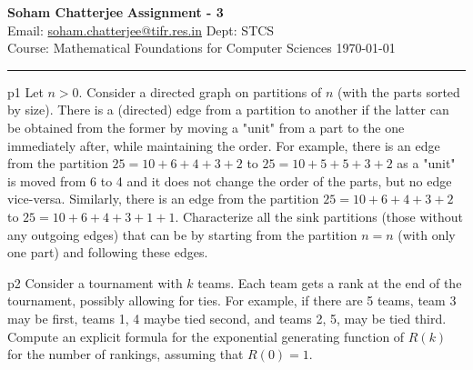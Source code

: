 \documentclass[a4paper, 11pt]{article}
\begin{document}
	
	
	{\noindent \large\textbf{Soham Chatterjee} \hfill \textbf{Assignment - 3}\\
		Email: \href{soham.chatterjee@tifr.res.in}{soham.chatterjee@tifr.res.in} \hfill Dept: STCS\\
		\normalsize Course: Mathematical Foundations for Computer Sciences \hfill \today\\ 
		\noindent\rule{7in}{2.8pt}}
	
	
\begin{problem}{%
	}{p1%
}
Let $n>0$. Consider a directed graph on partitions of $n$ (with the parts sorted by size). There is a (directed) edge from a partition to another if the latter can be obtained from the former by moving a "unit" from a part to the one immediately after, while maintaining the order. For example, there is an edge from the partition $25=10+6+4+3+2$ to $25=10+5+5+3+2$ as a "unit" is moved from 6 to 4 and it does not change the order of the parts, but no edge vice-versa. Similarly, there is an edge from the partition $25=10+6+4+3+2$ to $25=10+6+4+3+1+1$. Characterize all the sink partitions (those without any outgoing edges) that can be by starting from the partition $n=n$ (with only one part) and following these edges.
\end{problem}
\solve{
}

\begin{problem}{%
	}{p2%
	}
Consider a tournament with $k$ teams. Each team gets a rank at the end of the tournament, possibly allowing for ties. For example, if there are 5 teams, team 3 may be first, teams 1, 4 maybe tied second, and teams 2, 5, may be tied third. Compute an explicit formula for the exponential generating function of $R(k)$ for the number of rankings, assuming that $R(0)=1$.
\end{problem}
\solve{	

}
\end{document}

